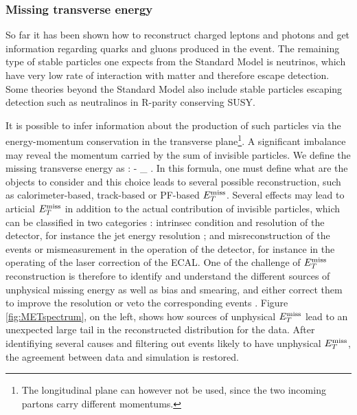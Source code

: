             \subsubsection{Missing transverse energy}

        So far it has been shown how to reconstruct charged leptons and photons and get
        information regarding quarks and gluons produced in the event. The remaining
        type of stable particles one expects from the Standard Model is neutrinos, which
        have very low rate of interaction with matter and therefore escape detection. Some
        theories beyond the Standard Model also include stable particles escaping detection
        such as neutralinos in R-parity conserving SUSY.

        It is possible to infer information about the production
        of such particles via the energy-momentum conservation in the transverse plane\footnote{The
        longitudinal plane can however not be used, since the two incoming partons carry
        different momentums.}. A significant imbalance may reveal the momentum carried by
        the sum of invisible particles. We define the missing transverse energy as :
        {
            \MET {} - \sum_{} \vec{\pT}.
        }
        In this formula, one must define what are the objects to consider and this choice
        leads to several possible reconstruction, such as calorimeter-based, track-based
        or PF-based $E_T^\text{miss}$. Several effects may lead to articial $E_T^\text{miss}$ in addition to the
        actual contribution of invisible particles, which can be classified in two categories :
        intrinsec condition and resolution of the detector, for instance the jet energy
        resolution ; and misreconstruction of the events or mismeasurement in the
        operation of the detector, for instance in the operating of the laser correction
        of the ECAL. One of the challenge of $E_T^\text{miss}$ reconstruction is therefore to identify
        and understand the different sources of unphysical missing energy as well as bias and
        smearing, and either correct them to improve the resolution or veto the corresponding
        events
        .
        Figure \ref{fig:METspectrum}, on the left, shows how sources of unphysical $E_T^\text{miss}$
        lead to an unexpected large tail in the reconstructed distribution for the data.
        After identifiying several causes and filtering out events likely to have unphysical
        $E_T^\text{miss}$, the agreement between data and simulation is restored.

